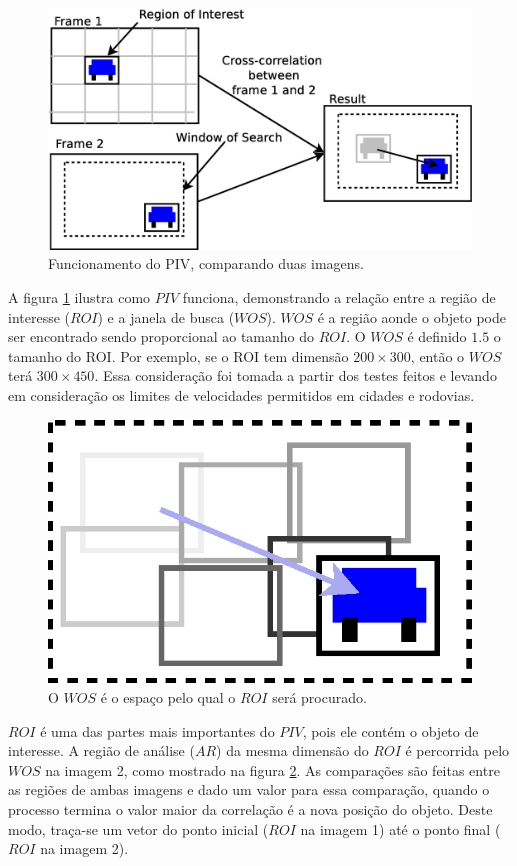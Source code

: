 \begin{figure}[H]
\includegraphics[width=\columnwidth]{images/explanationPIV.eps}
\caption{Funcionamento do PIV, comparando duas imagens.}
\label{fig:twoframes}
\end{figure}

A figura \ref{fig:twoframes} ilustra como $PIV$ funciona, demonstrando a relação entre a região de interesse ($ROI$) e 
a janela de busca ($WOS$). $WOS$ é a região aonde o objeto pode ser encontrado sendo proporcional ao tamanho do $ROI$.
O $WOS$ é definido $1.5$ o tamanho do ROI. Por exemplo, se o ROI tem dimensão $200\times300$, então o $WOS$ terá $300\times450$.
Essa consideração foi tomada a partir dos testes feitos e levando em consideração os limites de velocidades permitidos em 
cidades e rodovias.


\begin{figure}[H]
\includegraphics[width=\columnwidth]{images/WOSdivided.eps}
\caption{O $WOS$ é o espaço pelo qual o $ROI$ será procurado.}
\label{fig:WOSdivided}
\end{figure}

$ROI$ é uma das partes mais importantes do $PIV$, pois ele contém o objeto de interesse. A região de análise
($AR$) da mesma dimensão do $ROI$ é percorrida pelo $WOS$ na imagem 2, como mostrado na figura \ref{fig:WOSdivided}.
As comparações são feitas entre as regiões de ambas imagens e dado um valor para essa comparação, quando o processo termina o valor
maior da correlação é a nova posição do objeto. Deste modo, traça-se um vetor do ponto inicial ($ROI$ na imagem 1) até o ponto final
($ROI$ na imagem 2).
